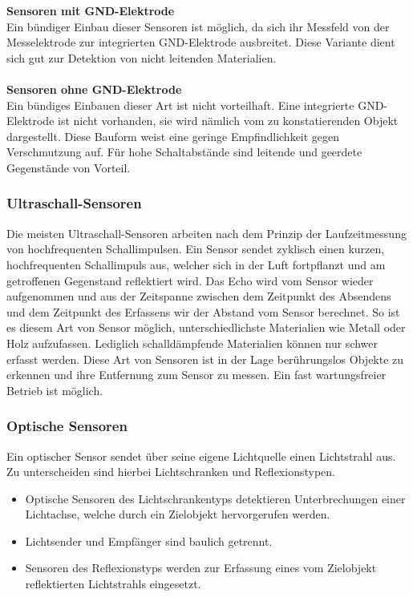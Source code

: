 \textbf{Sensoren mit GND-Elektrode} \\
Ein bündiger Einbau dieser Sensoren ist möglich, da sich ihr Messfeld von der Messelektrode zur integrierten GND-Elektrode ausbreitet.
Diese Variante dient sich gut zur Detektion von nicht leitenden Materialien. \\\\

\textbf{Sensoren ohne GND-Elektrode} \\
Ein bündiges Einbauen dieser Art ist nicht vorteilhaft.
Eine integrierte GND-Elektrode ist nicht vorhanden, sie wird nämlich vom zu konstatierenden Objekt dargestellt.
Diese Bauform weist eine geringe Empfindlichkeit gegen Verschmutzung auf.
Für hohe Schaltabstände sind leitende und geerdete Gegenstände von Vorteil.

\subsubsection{Ultraschall-Sensoren}
Die meisten Ultraschall-Sensoren arbeiten nach dem Prinzip der Laufzeitmessung von hochfrequenten Schallimpulsen.
Ein Sensor sendet zyklisch einen kurzen, hochfrequenten Schallimpuls aus, welcher sich in der Luft fortpflanzt und am getroffenen Gegenstand reflektiert wird.
Das Echo wird vom Sensor wieder aufgenommen und aus der Zeitspanne zwischen dem Zeitpunkt des Absendens und dem Zeitpunkt des Erfassens wir der Abstand vom Sensor berechnet.
So ist es diesem Art von Sensor möglich, unterschiedlichste Materialien wie Metall oder Holz aufzufassen.
Lediglich schalldämpfende Materialien können nur schwer erfasst werden.
Diese Art von Sensoren ist in der Lage berührungslos Objekte zu erkennen und ihre Entfernung zum Sensor zu messen.
Ein fast wartungsfreier Betrieb ist möglich.

\subsubsection{Optische Sensoren}
Ein optischer Sensor sendet über seine eigene Lichtquelle einen Lichtstrahl aus.
Zu unterscheiden sind hierbei Lichtschranken und Reflexionstypen.

\begin{itemize}
\item Optische Sensoren des Lichtschrankentyps detektieren Unterbrechungen einer Lichtachse, welche durch ein Zielobjekt hervorgerufen werden.
\item Lichtsender und Empfänger sind baulich getrennt.

\item Sensoren des Reflexionstyps werden zur Erfassung eines vom Zielobjekt reflektierten Lichtstrahls eingesetzt.
\end{itemize}

